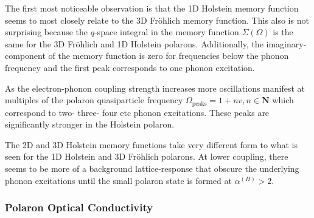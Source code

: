 The first most noticeable observation is that the 1D Holstein memory function seems to most closely relate to the 3D Fr\"ohlich memory function. This also is not surprising because the $q$-space integral in the memory function $\Sigma(\Omega)$ is the same for the 3D Fr\"ohlich and 1D Holstein polarons. Additionally, the imaginary-component of the memory function is zero for frequencies below the phonon frequency and the first peak corresponds to one phonon excitation.
\newline

As the electron-phonon coupling strength increases more oscillations manifest at multiples of the polaron quasiparticle frequency $\Omega_{\text{peaks}} = 1 + n v, n \in \mathbf{N}$ which correspond to two- three- four etc phonon excitations. These peaks are significantly stronger in the Holstein polaron. 
\newline

The 2D and 3D Holstein memory functions take very different form to what is seen for the 1D Holstein and 3D Fr\"ohlich polarons. At lower coupling, there seems to be more of a background lattice-response that obscure the underlying phonon excitations until the small polaron state is formed at $\alpha^{(H)} > 2$.

\subsubsection{Polaron Optical Conductivity}

